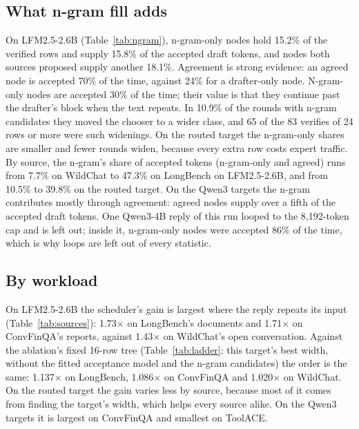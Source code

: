 \documentclass[10pt,twocolumn,letterpaper]{article}
\begin{document}
\subsection{What n-gram fill adds}\label{sec:4.3}



On LFM2.5-2.6B (Table~\ref{tab:ngram}), n-gram-only nodes hold 15.2\% of the verified rows and supply 15.8\% of the accepted draft tokens, and nodes both sources proposed supply another 18.1\%. Agreement is strong evidence: an agreed node is accepted 70\% of the time, against 24\% for a drafter-only node. N-gram-only nodes are accepted 30\% of the time; their value is that they continue past the drafter's block when the text repeats. In 10.9\% of the rounds with n-gram candidates they moved the chooser to a wider class, and 65 of the 83 verifies of 24 rows or more were such widenings. On the routed target the n-gram-only shares are smaller and fewer rounds widen, because every extra row costs expert traffic. By source, the n-gram's share of accepted tokens (n-gram-only and agreed) runs from 7.7\% on WildChat to 47.3\% on LongBench on LFM2.5-2.6B, and from 10.5\% to 39.8\% on the routed target. On the Qwen3 targets the n-gram contributes mostly through agreement: agreed nodes supply over a fifth of the accepted draft tokens. One Qwen3-4B reply of this run looped to the 8,192-token cap and is left out; inside it, n-gram-only nodes were accepted 86\% of the time, which is why loops are left out of every statistic.

\subsection{By workload}\label{sec:4.4}



On LFM2.5-2.6B the scheduler's gain is largest where the reply repeats its input (Table~\ref{tab:sources}): 1.73$\times$ on LongBench's documents and 1.71$\times$ on ConvFinQA's reports, against 1.43$\times$ on WildChat's open conversation. Against the ablation's fixed 16-row tree (Table~\ref{tab:ladder}: this target's best width, without the fitted acceptance model and the n-gram candidates) the order is the same: 1.137$\times$ on LongBench, 1.086$\times$ on ConvFinQA and 1.020$\times$ on WildChat. On the routed target the gain varies less by source, because most of it comes from finding the target's width, which helps every source alike. On the Qwen3 targets it is largest on ConvFinQA and smallest on ToolACE.
\end{document}
